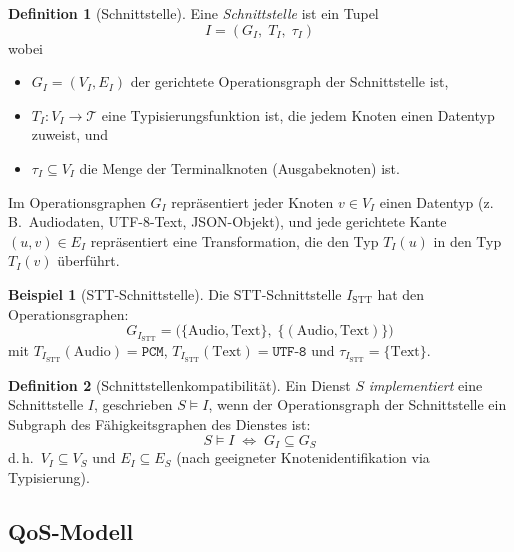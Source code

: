 ﻿\documentclass[a4paper,12pt]{article}
\theoremstyle{definition}
\newtheorem{definition}{Definition}
\newtheorem{beispiel}{Beispiel}
\begin{document}
\begin{definition}[Schnittstelle]
\label{def:schnittstelle}
Eine \emph{Schnittstelle} ist ein Tupel
\[
    I = (G_I,\; T_I,\; \tau_I)
\]
wobei
\begin{itemize}
    \item $G_I = (V_I, E_I)$ der gerichtete Operationsgraph der Schnittstelle ist,
    \item $T_I: V_I \to \mathcal{T}$ eine Typisierungsfunktion ist, die jedem Knoten einen Datentyp zuweist, und
    \item $\tau_I \subseteq V_I$ die Menge der Terminalknoten (Ausgabeknoten) ist.
\end{itemize}
\end{definition}

Im Operationsgraphen $G_I$ repräsentiert jeder Knoten $v \in V_I$ einen Datentyp (z.\,B.\ Audiodaten, UTF-8-Text, JSON-Objekt), und jede gerichtete Kante $(u, v) \in E_I$ repräsentiert eine Transformation, die den Typ $T_I(u)$ in den Typ $T_I(v)$ überführt.

\begin{beispiel}[STT-Schnittstelle]
Die STT-Schnittstelle $I_{\mathrm{STT}}$ hat den Operationsgraphen:
\[
G_{I_{\mathrm{STT}}} = \bigl(\{\text{Audio}, \text{Text}\},\; \{(\text{Audio}, \text{Text})\}\bigr)
\]
mit $T_{I_{\mathrm{STT}}}(\text{Audio}) = \texttt{PCM}$, $T_{I_{\mathrm{STT}}}(\text{Text}) = \texttt{UTF-8}$ und $\tau_{I_{\mathrm{STT}}} = \{\text{Text}\}$.
\end{beispiel}

\begin{definition}[Schnittstellenkompatibilität]
\label{def:kompatibilitaet}
Ein Dienst $S$ \emph{implementiert} eine Schnittstelle $I$, geschrieben $S \models I$, wenn der Operationsgraph der Schnittstelle ein Subgraph des Fähigkeitsgraphen des Dienstes ist:
\[
    S \models I \;\iff\; G_I \subseteq G_S
\]
d.\,h.\ $V_I \subseteq V_S$ und $E_I \subseteq E_S$ (nach geeigneter Knotenidentifikation via Typisierung).
\end{definition}

\subsection{QoS-Modell}
\end{document}
